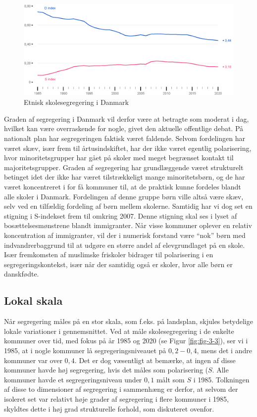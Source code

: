 \documentclass[
]{book}
\begin{document}
\begin{figure}
\includegraphics[width=1\linewidth]{images/figur_3_2} \caption{Etnisk skolesegregering i Danmark}\label{fig:fig-3-2}
\end{figure}

Graden af segregering i Danmark vil derfor være at betragte som moderat i dag, hvilket kan være overraskende for nogle, givet den aktuelle offentlige debat. På nationalt plan har segregeringen faktisk været faldende. Selvom fordelingen har været skæv, især frem til årtusindskiftet, har der ikke været egentlig polarisering, hvor minoritetsgrupper har gået på skoler med meget begrænset kontakt til majoritetsgrupper. Graden af segregering har grundlæggende været strukturelt betinget idet der ikke har været tilstrækkeligt mange minoritetsbørn, og de har været koncentreret i for få kommuner til, at de praktisk kunne fordeles blandt alle skoler i Danmark. Fordelingen af denne gruppe børn ville altså være skæv, selv ved en tilfældig fordeling af børn mellem skolerne. Samtidig har vi dog set en stigning i S-indekset frem til omkring 2007. Denne stigning skal ses i lyset af bosættelsesmønstrene blandt immigranter. Når visse kommuner oplever en relativ koncentration af immigranter, vil der i numerisk forstand være ``nok'' børn med indvandrerbaggrund til at udgøre en større andel af elevgrundlaget på en skole. Især fremkomsten af muslimske friskoler bidrager til polarisering i en segregeringskontekst, især når der samtidig også er skoler, hvor alle børn er danskfødte.

\hypertarget{lokal-skala}{%
\subsection{Lokal skala}\label{lokal-skala}}

Når segregering måles på en stor skala, som f.eks. på landsplan, skjules betydelige lokale variationer i gennemsnittet. Ved at måle skolesegregering i de enkelte kommuner over tid, med fokus på år 1985 og 2020 (se Figur \ref{fig:fig-3-3}), ser vi i 1985, at i nogle kommuner lå segregeringsniveauet på \(0,2-0,4\), mens det i andre kommuner var over \(0,4\). Det er dog væsentligt at bemærke, at ingen af disse kommuner havde høj segregering, hvis det måles som polarisering (\(S\). Alle kommuner havde et segregeringsniveau under \(0,1\) målt som \(S\) i 1985. Tolkningen af disse to dimensioner af segregering i sammenhæng er derfor, at selvom der isoleret set var relativt høje grader af segregering i flere kommuner i 1985, skyldtes dette i høj grad strukturelle forhold, som diskuteret ovenfor.
\end{document}
